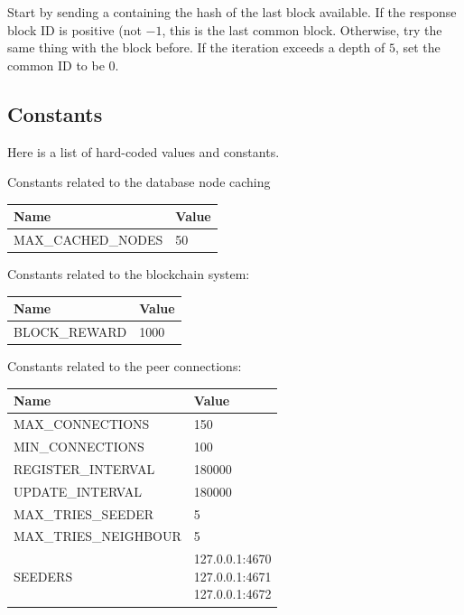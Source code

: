 \documentclass[../documentation.tex]{subfiles}
\begin{document}
Start by sending a  containing the hash of the last block
available. If the response block ID is positive (not \(-1\), this is the last common block.
Otherwise, try the same thing with the block before. If the iteration exceeds a depth of \(5\),
set the common ID to be 0.

\pagebreak

\hypertarget{constants}{}
\subsection{Constants}

Here is a list of hard-coded values and constants.

Constants related to the database node caching

\bgroup{}
\def\arraystretch{1.25}
\begin{tabular}{|l|l|}
    \hline
    \textbf{Name} & \textbf{Value}
    \\ \hline
    MAX\_CACHED\_NODES & 50
    \\ \hline
\end{tabular}
\egroup{}

Constants related to the blockchain system:

\bgroup{}
\def\arraystretch{1.25}
\begin{tabular}{|l|l|}
    \hline
    \textbf{Name} & \textbf{Value}
    \\ \hline
    BLOCK\_REWARD & 1000
    \\ \hline
\end{tabular}
\egroup{}

Constants related to the peer connections:

\bgroup{}
\def\arraystretch{1.25}
\begin{tabular}{|l|l|}
    \hline
    \textbf{Name} & \textbf{Value}
    \\ \hline
    MAX\_CONNECTIONS & 150
    \\ \hline
    MIN\_CONNECTIONS & 100
    \\ \hline
    REGISTER\_INTERVAL & 180000
    \\ \hline
    UPDATE\_INTERVAL & 180000
    \\ \hline
    MAX\_TRIES\_SEEDER & 5
    \\ \hline
    MAX\_TRIES\_NEIGHBOUR & 5
    \\ \hline
    SEEDERS & \makecell[t] {
        127.0.0.1:4670 \\
        127.0.0.1:4671 \\
        127.0.0.1:4672
    }
    \\ \hline
\end{tabular}
\egroup{}
\end{document}
